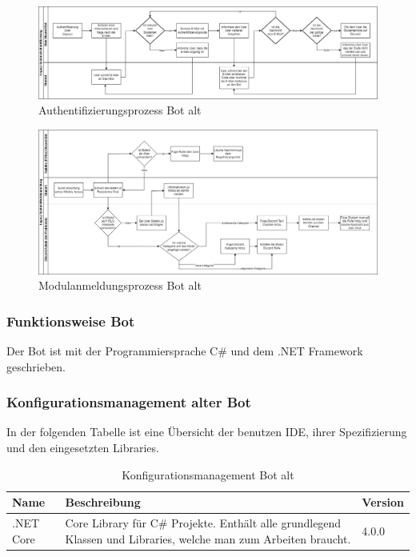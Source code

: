 \documentclass[a4paper, table]{article}
\begin{document}
\begin{landscape}
    \begin{figure}[ht]
        \centering
        \hspace*{-4.1cm}
        \includegraphics[width=1.9\textwidth]{img/Authentifizierungsprozess_Bot_alt.png}
        \caption{Authentifizierungsprozess Bot alt}
        \label{fig:Authentifizierungsprozess_Bot_alt}
    \end{figure}
    \clearpage
    \begin{figure}[ht]
        \centering
        \hspace*{-4.1cm}
        \includegraphics[width=1.9\textwidth]{img/Modulanmeldungsprozess_Bot_alt.png}
        \caption{Modulanmeldungsprozess Bot alt}
        \label{fig:Modulanmeldungsprozess_Bot_alt}
    \end{figure}
\end{landscape}

\subsubsection{Funktionsweise Bot}
Der Bot ist mit der Programmiersprache C\# und dem .NET Framework geschrieben.

\subsubsection*{Konfigurationsmanagement alter Bot}
In der folgenden Tabelle ist eine \"Ubersicht der benutzen IDE, ihrer Spezifizierung und den eingesetzten Libraries.
\begin{table}[h]
    \centering
    \begin{tabular}{|l|p{20em}|l|}
        \hline
        \rowcolor[gray]{.9} Name & Beschreibung & Version \\
        \hline
        .NET Core & Core Library für C\# Projekte.
        Enthält alle grundlegend Klassen und Libraries, welche man zum Arbeiten braucht. & 4.0.0 \\
        \hline
    \end{tabular}
    \caption{Konfigurationsmanagement Bot alt}
    \label{tab: Konfigurationsmanagement-Bot-alt}
\end{table}
\end{document}
